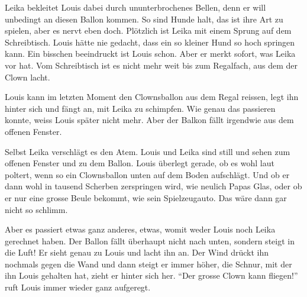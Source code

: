 Leika bekleitet Louis dabei durch ununterbrochenes Bellen, denn er will unbedingt an diesen Ballon kommen. So sind Hunde halt, das ist ihre Art zu spielen, aber es nervt eben doch. Plötzlich ist Leika mit einem Sprung auf dem Schreibtisch. Louis hätte nie gedacht, dass ein so kleiner Hund so hoch springen kann. Ein bisschen beeindruckt ist Louis schon. Aber er merkt sofort, was Leika vor hat. Vom Schreibtisch ist es nicht mehr weit bis zum Regalfach, aus dem der Clown lacht. 

Louis kann im letzten Moment den Clownsballon aus dem Regal reissen, legt ihn hinter sich und fängt an, mit Leika zu schimpfen. Wie genau das passieren konnte, weiss Louis später nicht mehr. Aber der Balkon fällt irgendwie aus dem offenen Fenster.

Selbst Leika verschlägt es den Atem. Louis und Leika sind still und sehen zum offenen Fenster und zu dem Ballon. Louis überlegt gerade, ob es wohl laut poltert, wenn so ein Clownsballon unten auf dem Boden aufschlägt. Und ob er dann wohl in tausend Scherben zerspringen wird, wie neulich Papas Glas, oder ob er nur eine grosse Beule bekommt, wie sein Spielzeugauto. Das wäre dann gar nicht so schlimm.

Aber es passiert etwas ganz anderes, etwas, womit weder Louis noch Leika gerechnet haben. Der Ballon fällt überhaupt nicht nach unten, sondern steigt in die Luft! Er sieht genau zu Louis und lacht ihn an. Der Wind drückt ihn nochmals gegen die Wand und dann steigt er immer höher, die Schnur, mit der ihn Louis gehalten hat, zieht er hinter sich her.
\enquote{Der grosse Clown kann fliegen!} ruft Louis immer wieder ganz aufgeregt.

